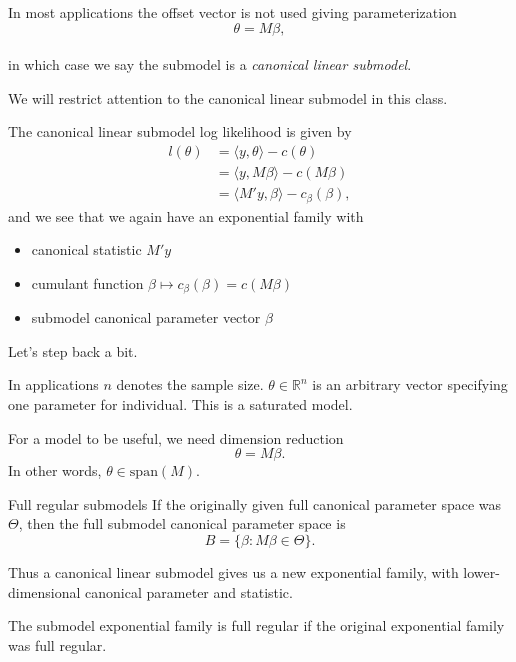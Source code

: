 \documentclass[
  ignorenonframetext,
]{beamer}
\providecommand{\tightlist}{%
  \setlength{\itemsep}{0pt}\setlength{\parskip}{0pt}}
\begin{document}
\begin{frame}{}
\protect\hypertarget{section}{}
In most applications the offset vector is not used giving
parameterization \[
  \theta = M\beta,
\]\\
in which case we say the submodel is a \emph{canonical linear submodel}.

We will restrict attention to the canonical linear submodel in this
class.
\end{frame}

\begin{frame}{}
\protect\hypertarget{section-1}{}
The canonical linear submodel log likelihood is given by
\begin{equation} \label{subloglike}
\begin{split}
  l(\theta) &= \langle y,\theta\rangle - c(\theta) \\
    &= \langle y,M\beta\rangle - c(M\beta) \\
    &= \langle M'y,\beta\rangle - c_\beta(\beta),   
\end{split}
\end{equation} and we see that we again have an exponential family with

\begin{itemize}
\tightlist
\item
  canonical statistic \(M'y\)
\item
  cumulant function \(\beta \mapsto c_\beta(\beta) = c(M\beta)\)
\item
  submodel canonical parameter vector \(\beta\)
\end{itemize}
\end{frame}

\begin{frame}{}
\protect\hypertarget{section-2}{}
Let's step back a bit.

In applications \(n\) denotes the sample size.
\(\theta \in \mathbb{R}^n\) is an arbitrary vector specifying one
parameter for individual. This is a saturated model.

For a model to be useful, we need dimension reduction \[
  \theta = M\beta.
\] In other words, \(\theta \in \text{span}(M)\).
\end{frame}

\begin{frame}{Full regular submodels}
\protect\hypertarget{full-regular-submodels}{}
If the originally given full canonical parameter space was \(\Theta\),
then the full submodel canonical parameter space is \[
  B = \{\beta : M\beta \in \Theta\}.
\]

Thus a canonical linear submodel gives us a new exponential family, with
lower-dimensional canonical parameter and statistic.

The submodel exponential family is full regular if the original
exponential family was full regular.
\end{frame}
\end{document}
